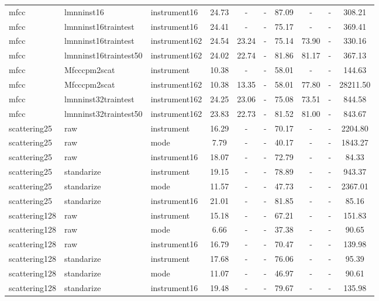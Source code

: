 \begin{tabular}{lllccccccc}
mfcc & lmnninst16 & instrument16 & 24.73 &   - &   - & 87.09 &   - &   - &    308.21 \\ 
mfcc & lmnninst16traintest & instrument16 & 24.41 &   - &   - & 75.17 &   - &   - &    369.41 \\ 
mfcc & lmnninst16traintest & instrument162 & 24.54 & 23.24 &   - & 75.14 & 73.90 &   - &    330.16 \\ 
mfcc & lmnninst16traintest50 & instrument162 & 24.02 & 22.74 &   - & 81.86 & 81.17 &   - &    367.13 \\ 
mfcc & Mfcccpm2scat & instrument & 10.38 &   - &   - & 58.01 &   - &   - &    144.63 \\ 
mfcc & Mfcccpm2scat & instrument162 & 10.38 & 13.35 &   - & 58.01 & 77.80 &   - &  28211.50 \\ 
mfcc & lmnninst32traintest & instrument162 & 24.25 & 23.06 &   - & 75.08 & 73.51 &   - &    844.58 \\ 
mfcc & lmnninst32traintest50 & instrument162 & 23.83 & 22.73 &   - & 81.52 & 81.00 &   - &    843.67 \\ 
scattering25 & raw & instrument & 16.29 &   - &   - & 70.17 &   - &   - &   2204.80 \\ 
scattering25 & raw & mode &  7.79 &   - &   - & 40.17 &   - &   - &   1843.27 \\ 
scattering25 & raw & instrument16 & 18.07 &   - &   - & 72.79 &   - &   - &     84.33 \\ 
scattering25 & standarize & instrument & 19.15 &   - &   - & 78.89 &   - &   - &    943.37 \\ 
scattering25 & standarize & mode & 11.57 &   - &   - & 47.73 &   - &   - &   2367.01 \\ 
scattering25 & standarize & instrument16 & 21.01 &   - &   - & 81.85 &   - &   - &     85.16 \\ 
scattering128 & raw & instrument & 15.18 &   - &   - & 67.21 &   - &   - &    151.83 \\ 
scattering128 & raw & mode &  6.66 &   - &   - & 37.38 &   - &   - &     90.65 \\ 
scattering128 & raw & instrument16 & 16.79 &   - &   - & 70.47 &   - &   - &    139.98 \\ 
scattering128 & standarize & instrument & 17.68 &   - &   - & 76.06 &   - &   - &     95.39 \\ 
scattering128 & standarize & mode & 11.07 &   - &   - & 46.97 &   - &   - &     90.61 \\ 
scattering128 & standarize & instrument16 & 19.48 &   - &   - & 79.67 &   - &   - &    135.98 \\ 

\end{tabular}
